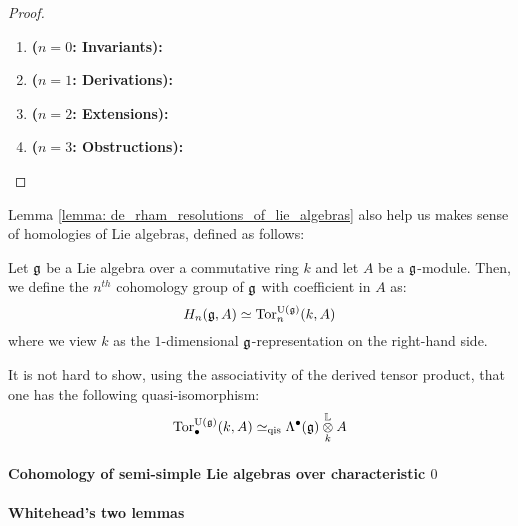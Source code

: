                         \begin{proof}
                            \noindent
                            \begin{enumerate}
                                \item \textbf{($n = 0$: Invariants):}
                                \item \textbf{($n = 1$: Derivations):}
                                \item \textbf{($n = 2$: Extensions):}
                                \item \textbf{($n = 3$: Obstructions):}
                            \end{enumerate}
                        \end{proof}
                    
                    Lemma \ref{lemma: de_rham_resolutions_of_lie_algebras} also help us makes sense of homologies of Lie algebras, defined as follows:
                    \begin{definition} \label{def: lie_algebra_homologies}
                        Let $\mathfrak{g}$ be a Lie algebra over a commutative ring $k$ and let $A$ be a $\mathfrak{g}$-module. Then, we define the $n^{th}$ cohomology group of $\mathfrak{g}$ with coefficient in $A$ as:
                            $$H_n(\mathfrak{g}, A) \simeq \mathrm{Tor}_n^{\mathrm{U}(\mathfrak{g})}(k, A)$$
                        where we view $k$ as the $1$-dimensional $\mathfrak{g}$-representation on the right-hand side. 
                    \end{definition}
                    \begin{remark}
                        It is not hard to show, using the associativity of the derived tensor product, that one has the following quasi-isomorphism:
                            $$\Tor_{\bullet}^{\U(\g)}(k, A) \cong_{\qis} \Lambda^{\bullet}(\g) \tensor_k^{\L} A$$
                    \end{remark}
                
                \paragraph{Cohomology of semi-simple Lie algebras over characteristic \texorpdfstring{$0$}{}}
                
                \paragraph{Whitehead's two lemmas}
                    
